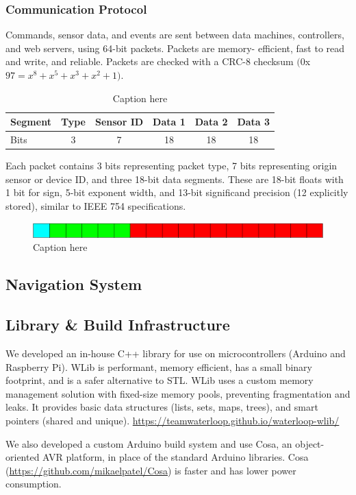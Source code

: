 \documentclass{report}
\begin{document}
    \subsubsection{Communication Protocol}
    Commands, sensor data, and events are sent between data machines, controllers, and web servers, using 64-bit packets. Packets are memory-		efficient, fast to read and write, and reliable. Packets are checked with a CRC-8 checksum $(0$x$97 = x^8 + x^5 + x^3 + x^2 + 1)$.
    \begin{table}[H]
    	\centering
    	\begin{tabular}{@{}lccccc@{}} \toprule
            Segment & Type & Sensor ID & Data 1 & Data 2 & Data 3 \\ \midrule
            Bits & 3 & 7 & 18 & 18 & 18 \\ \bottomrule
        \end{tabular}
        \caption{Caption here}
    \end{table} 
    Each packet contains 3 bits representing packet type, 7 bits representing origin sensor or device ID, and three 18-bit data segments. These are 18-bit floats with 1 bit for sign, 5-bit exponent width, and 13-bit significand precision (12 explicitly stored), similar to IEEE 754 specifications.
	\begin{figure}[H]
        \centering
        \includegraphics[width = \textwidth]{images/fig326.PNG}
    	\caption{Caption here}
    \end{figure}
    \subsection{Navigation System}
    \subsection{Library \& Build Infrastructure}
    We developed an in-house C++ library for use on microcontrollers (Arduino and Raspberry Pi). WLib is performant, memory efficient, has a small binary footprint, and is a safer alternative to STL. WLib uses a custom memory management solution with fixed-size memory pools, preventing fragmentation and leaks. It provides basic data structures (lists, sets, maps, trees), and smart pointers (shared and unique).
    \url{https://teamwaterloop.github.io/waterloop-wlib/}
    
    We also developed a custom Arduino build system and use Cosa, an object-oriented AVR platform, in place of the standard Arduino libraries. Cosa (\url{https://github.com/mikaelpatel/Cosa}) is faster and has lower power consumption.
\end{document}
